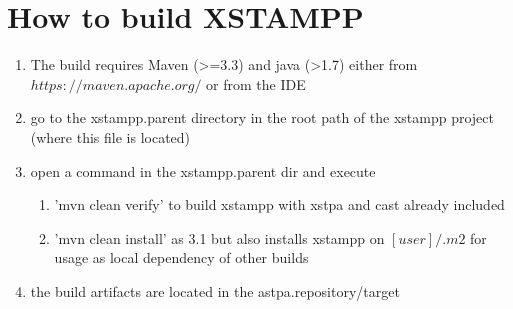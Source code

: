 \section{How to build XSTAMPP}

\begin{enumerate} 
\item The build requires Maven (>=3.3) and java (>1.7) either from $https://maven.apache.org/$ or from the IDE
\item go to the xstampp.parent directory in the root path of the xstampp project (where this file is located)
\item open a command in the xstampp.parent dir and execute 
	\begin{enumerate} 
	\item 'mvn clean verify' to build xstampp with xstpa and cast already included
	\item 'mvn clean install' as 3.1 but also installs xstampp on $[user]/.m2$ for usage as local dependency of other builds
	\end{enumerate} 
\item the build artifacts are located in the astpa.repository/target	
\end{enumerate} 